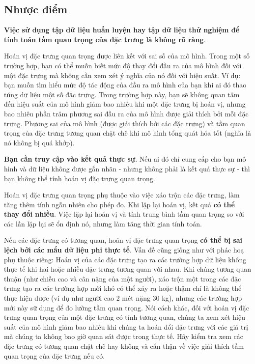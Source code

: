 \subsection{Nhược điểm}
\textbf{Việc sử dụng tập dữ liệu huấn luyện hay tập dữ liệu thử nghiệm để tính toán tầm quan trọng của đặc trưng là không rõ ràng}.

Hoán vị đặc trưng quan trọng được liên kết với sai số của mô hình. Trong một số trường hợp, bạn có thể muốn biết mức độ thay đổi đầu ra của mô hình đối với một đặc trưng mà không cần xem xét ý nghĩa của nó đối với hiệu suất. Ví dụ: bạn muốn tìm hiểu mức độ tác động của đầu ra mô hình của bạn khi ai đó thao túng dữ liệu một số đặc trưng. Trong trường hợp này, bạn sẽ không quan tâm đến hiệu suất của mô hình giảm bao nhiêu khi một đặc trưng bị hoán vị, nhưng bao nhiêu phần trăm phương sai đầu ra của mô hình được giải thích bởi mỗi đặc trưng. Phương sai của mô hình (được giải thích bởi các đặc trưng) và tầm quan trọng của đặc trưng tương quan chặt chẽ khi mô hình tổng quát hóa tốt (nghĩa là nó không bị quá khớp).

\textbf{Bạn cần truy cập vào kết quả thực sự}. Nếu ai đó chỉ cung cấp cho bạn mô hình và dữ liệu không được gắn nhãn - nhưng không phải là kết quả thực sự - thì bạn không thể tính hoán vị đặc trưng quan trọng.

Hoán vị đặc trưng quan trọng phụ thuộc vào việc xáo trộn các đặc trưng, làm tăng thêm tính ngẫu nhiên cho phép đo. Khi lặp lại hoán vị, kết quả \textbf{có thể thay đổi nhiều}. Việc lặp lại hoán vị và tính trung bình tầm quan trọng so với các lần lặp lại sẽ ổn định nó, nhưng làm tăng thời gian tính toán.

Nếu các đặc trưng có tương quan, hoán vị đặc trưng quan trọng \textbf{có thể bị sai lệch bởi các mẩu dữ liệu phi thực tế}. Vấn đề cũng giống như với phác hoạ phụ thuộc riêng: Hoán vị của các đặc trưng tạo ra các trường hợp dữ liệu không thực tế khi hai hoặc nhiều đặc trưng tương quan với nhau. Khi chúng tương quan thuận (như chiều cao và cân nặng của một người), xáo trộn một trong các đặc trưng tạo ra các trường hợp mới khó có thể xảy ra hoặc thậm chí là không thể thực hiện được (ví dụ như người cao 2 mét nặng 30 kg), nhưng các trường hợp mới này sữ dụng để đo lường tầm quan trọng. Nói cách khác, đối với hoán vị đặc trưng quan trọng của một đặc trưng có tính tương quan, chúng ta xem xét hiệu suất của mô hình giảm bao nhiêu khi chúng ta hoán đổi đặc trưng với các giá trị mà chúng ta không bao giờ quan sát được trong thực tế. Hãy kiểm tra xem các đặc trưng có tương quan chặt chẽ hay không và cẩn thận về việc giải thích tầm quan trọng của đặc trưng nếu có.

